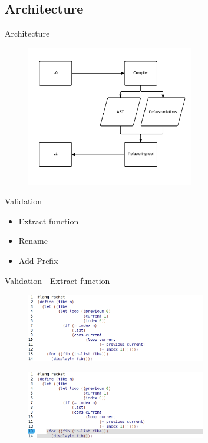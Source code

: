 \documentclass[xcolor=dvipsnames, 14pt]{beamer}
\begin{document}
\subsection{Architecture}
\begin{frame}{Architecture}
\begin{figure}[htbp]
  \centering
  \includegraphics[width=0.65\textwidth]{img/arquitectura.png}
  \label{fig:label}
\end{figure}
\end{frame}
\begin{frame}{Validation}
  \begin{itemize}
  \setlength\itemsep{2em}
  \item {
    Extract function
  }
  \item {
    Rename
  }
  \item {
    Add-Prefix
  }
  \end{itemize}
\end{frame}
\begin{frame}{Validation - Extract function}
\begin{figure}[htbp]
  \centering
  \includegraphics[width=0.7\textwidth]{img/fibonacci-1.png}
  \label{fig:fib-extract}
\end{figure}

\begin{figure}[htbp]
  \centering
  \includegraphics[width=0.7\textwidth]{img/fibonacci-select.png}
  \label{fig:fib-extract-one}
\end{figure}
\end{frame}
\end{document}
